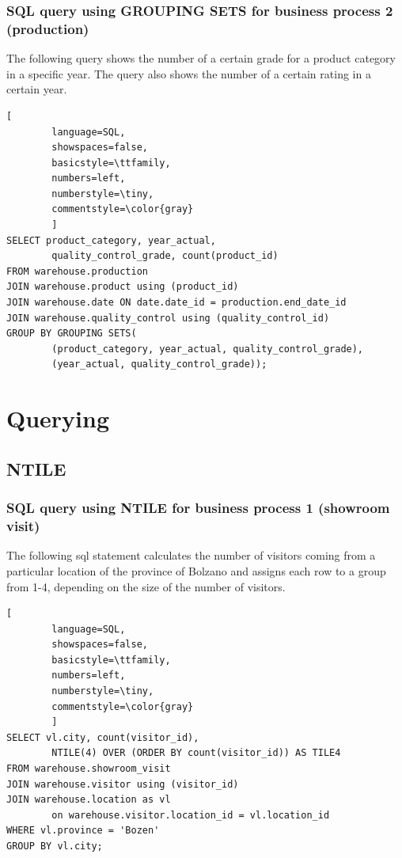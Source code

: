 \documentclass[letterpaper,12pt]{article}
\begin{document}
\subsubsection{SQL query using GROUPING SETS for business process 2 (production)}

The following query shows the number of a certain grade for a product category in a specific year. The query also shows the number of a certain rating in a certain year.

\begin{lstlisting}[
        language=SQL,
        showspaces=false,
        basicstyle=\ttfamily,
        numbers=left,
        numberstyle=\tiny,
        commentstyle=\color{gray}
        ]
SELECT product_category, year_actual, 
        quality_control_grade, count(product_id)
FROM warehouse.production
JOIN warehouse.product using (product_id)
JOIN warehouse.date ON date.date_id = production.end_date_id
JOIN warehouse.quality_control using (quality_control_id)
GROUP BY GROUPING SETS(
        (product_category, year_actual, quality_control_grade),
        (year_actual, quality_control_grade));
\end{lstlisting}

\section{Querying}

\subsection{NTILE}

\subsubsection{SQL query using NTILE for business process 1 (showroom visit)}

The following sql statement calculates the number of visitors coming from a particular location of the province of Bolzano and assigns each row to a group from 1-4, depending on the size of the number of visitors.

\begin{lstlisting}[
        language=SQL,
        showspaces=false,
        basicstyle=\ttfamily,
        numbers=left,
        numberstyle=\tiny,
        commentstyle=\color{gray}
        ]	 
SELECT vl.city, count(visitor_id), 
        NTILE(4) OVER (ORDER BY count(visitor_id)) AS TILE4
FROM warehouse.showroom_visit
JOIN warehouse.visitor using (visitor_id)
JOIN warehouse.location as vl 
        on warehouse.visitor.location_id = vl.location_id 
WHERE vl.province = 'Bozen'
GROUP BY vl.city;
\end{lstlisting}
      
\end{document}
